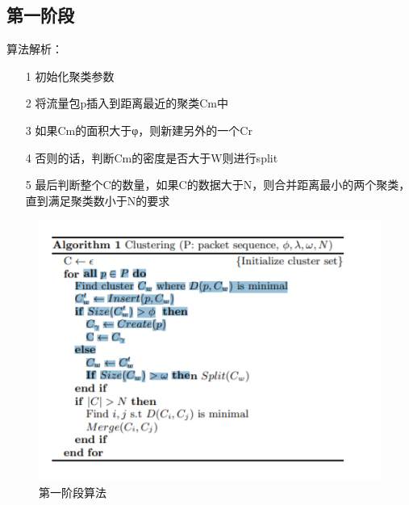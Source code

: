 \documentclass[UTF8]{ctexart}
\begin{document}
	\subsection{第一阶段}
	算法解析：
	\begin{itemize}
		\item[1] 初始化聚类参数
		\item[2] 将流量包p插入到距离最近的聚类Cm中
		\item[3] 如果Cm的面积大于φ，则新建另外的一个Cr
		\item[4] 否则的话，判断Cm的密度是否大于W则进行split
		\item[5] 最后判断整个C的数量，如果C的数据大于N，则合并距离最小的两个聚类，直到满足聚类数小于N的要求
	\end{itemize}
    \begin{figure}[ht]
        \centering
        \includegraphics[scale=2.0]{picture/004.png}
        \caption{第一阶段算法}
        \label{fig:004}
    \end{figure}
\end{document}
